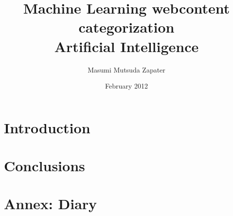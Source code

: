 \documentclass[a4paper , titlepage]{report}
\author{Masumi Mutsuda Zapater}
\title{Machine Learning webcontent categorization \\ Artificial Intelligence}
\date{February 2012}
\begin{document}
\maketitle



\tableofcontents


\chapter{Introduction}



\chapter{Conclusions}
%



\chapter{Annex: Diary }

\end{document}
